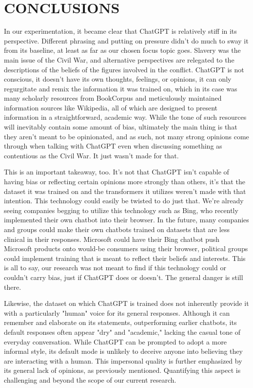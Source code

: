 \documentclass[letterpaper, 10pt, conference]{ieeeconf}
\begin{document}
    
    \section{CONCLUSIONS}
    
    In our experimentation, it became clear that ChatGPT is relatively stiff in its perspective. Different phrasing and putting on pressure didn’t do much to sway it from its baseline, at least as far as our chosen focus topic goes. Slavery was the main issue of the Civil War, and alternative perspectives are relegated to the descriptions of the beliefs of the figures involved in the conflict. ChatGPT is not conscious, it doesn’t have its own thoughts, feelings, or opinions, it can only regurgitate and remix the information it was trained on, which in its case was many scholarly resources from BookCorpus and meticulously maintained information sources like Wikipedia, all of which are designed to present information in a straightforward, academic way. While the tone of such resources will inevitably contain some amount of bias, ultimately the main thing is that they aren’t meant to be opinionated, and as such, not many strong opinions come through when talking with ChatGPT even when discussing something as contentious as the Civil War. It just wasn’t made for that.

    This is an important takeaway, too. It’s not that ChatGPT isn’t capable of having bias or reflecting certain opinions more strongly than others, it’s that the dataset it was trained on and the transformers it utilizes weren’t made with that intention. This technology could easily be twisted to do just that. We’re already seeing companies begging to utilize this technology such as Bing, who recently implemented their own chatbot into their browser. In the future, many companies and groups could make their own chatbots trained on datasets that are less clinical in their responses. Microsoft could have their Bing chatbot push Microsoft products onto would-be consumers using their browser, political groups could implement training that is meant to reflect their beliefs and interests. This is all to say, our research was not meant to find if this technology could or couldn’t carry bias, just if ChatGPT does or doesn’t. The general danger is still there.

    Likewise, the dataset on which ChatGPT is trained does not inherently provide it with a particularly "human" voice for its general responses. Although it can remember and elaborate on its statements, outperforming earlier chatbots, its default responses often appear "dry" and "academic," lacking the casual tone of everyday conversation. While ChatGPT can be prompted to adopt a more informal style, its default mode is unlikely to deceive anyone into believing they are interacting with a human. This impersonal quality is further emphasized by its general lack of opinions, as previously mentioned. Quantifying this aspect is challenging and beyond the scope of our current research.
\end{document}
